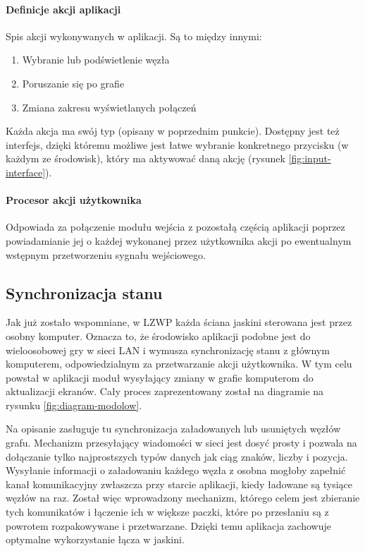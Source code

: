 \paragraph{Definicje akcji aplikacji}
Spis akcji wykonywanych w aplikacji. Są to między innymi: 
\begin{enumerate}[label=\textbullet]
	\item Wybranie lub podświetlenie węzła
	\item Poruszanie się po grafie
	\item Zmiana zakresu wyświetlanych połączeń
\end{enumerate}
Każda akcja ma swój typ (opisany w poprzednim punkcie). Dostępny jest też interfejs, dzięki któremu możliwe jest łatwe wybranie konkretnego przycisku (w każdym ze środowisk), który ma aktywować daną akcję (rysunek \ref{fig:input-interface}).

\paragraph{Procesor akcji użytkownika}
Odpowiada za połączenie modułu wejścia z pozostałą częścią aplikacji poprzez powiadamianie jej o każdej wykonanej przez użytkownika akcji po ewentualnym wstępnym przetworzeniu sygnału wejściowego.



\subsection{Synchronizacja stanu}
Jak już zostało wspomniane, w LZWP każda ściana jaskini sterowana jest przez osobny komputer. Oznacza to, że środowisko aplikacji podobne jest do wieloosobowej gry w sieci LAN i wymusza synchronizację stanu z głównym komputerem, odpowiedzialnym za przetwarzanie akcji użytkownika. W tym celu powstał w aplikacji moduł wysyłający zmiany w grafie komputerom do aktualizacji ekranów. Cały proces zaprezentowany został na diagramie na rysunku \ref{fig:diagram-modolow}.

Na opisanie zasługuje tu synchronizacja załadowanych lub usuniętych węzłów grafu. Mechanizm przesyłający wiadomości w sieci jest dosyć prosty i pozwala na dołączanie tylko najprostszych typów danych jak ciąg znaków, liczby i pozycja. Wysyłanie informacji o załadowaniu każdego węzła z osobna mogłoby zapełnić kanał komunikacyjny zwłaszcza przy starcie aplikacji, kiedy ładowane są tysiące węzłów na raz. Został więc wprowadzony mechanizm, którego celem jest zbieranie tych komunikatów i łączenie ich w większe paczki, które po przesłaniu są z powrotem rozpakowywane i przetwarzane. Dzięki temu aplikacja zachowuje optymalne wykorzystanie łącza w jaskini.

